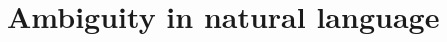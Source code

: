 \documentclass[11pt,a4paper]{article}
\begin{document}
\section{Ambiguity in natural language}

\noindent 
%
%
\end{document}
